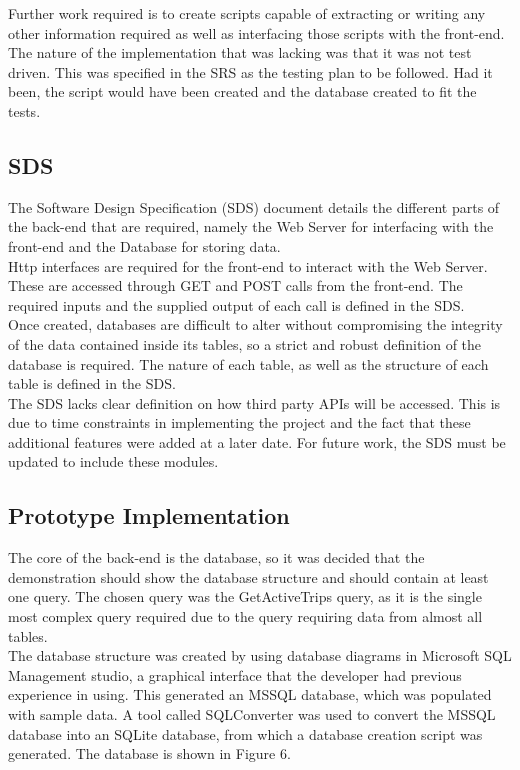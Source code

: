 \documentclass[12pt]{article}
\begin{document}
Further work required is to create scripts capable of extracting or writing any other information required as well as interfacing those scripts with the front-end.\\

The nature of the implementation that was lacking was that it was not test driven. This was specified in the SRS as the testing plan to be followed. Had it been, the script would have been created and the database created to fit the tests.
\subsection{SDS}
The Software Design Specification (SDS) document details the different parts of the back-end that are required, namely the Web Server for interfacing with the front-end and the Database for storing data. \\

Http interfaces are required for the front-end to interact with the Web Server. These are accessed through GET and POST calls from the front-end. The required inputs and the supplied output of each call is defined in the SDS. \\

Once created, databases are difficult to alter without compromising the integrity of the data contained inside its tables, so a strict and robust definition of the database is required. The nature of each table, as well as the structure of each table is defined in the SDS. \\

The SDS lacks clear definition on how third party APIs will be accessed. This is due to time constraints in implementing the project and the fact that these additional features were added at a later date. For future work, the SDS must be updated to include these modules.
\subsection{Prototype Implementation}
The core of the back-end is the database, so it was decided that the demonstration should show the database structure and should contain at least one query. The chosen query was the GetActiveTrips query, as it is the single most complex query required due to the query requiring data from almost all tables.\\

The database structure was created by using database diagrams in Microsoft SQL Management studio, a graphical interface that the developer had previous experience in using. This generated an MSSQL database, which was populated with sample data. A tool called SQLConverter was used to convert the MSSQL database into an SQLite database, from which a database creation script was generated. The database is shown in Figure 6.\\
\end{document}
